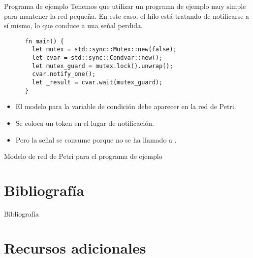 \documentclass{beamer}
\begin{document}
\begin{frame}[fragile]{Programa de ejemplo}
  Tenemos que utilizar un programa de ejemplo muy simple para mantener la red pequeña.
  En este caso, el hilo está tratando de notificarse a sí mismo, lo que conduce a una señal perdida.

  \begin{listing}
    \begin{verbatim}
      fn main() {
        let mutex = std::sync::Mutex::new(false);
        let cvar = std::sync::Condvar::new();
        let mutex_guard = mutex.lock().unwrap();
        cvar.notify_one();
        let _result = cvar.wait(mutex_guard);
      }     
    \end{verbatim}
  \end{listing}

  \begin{itemize}
    \item El modelo para la variable de condición debe aparecer en la red de Petri.
    \item Se coloca un token en el lugar de notificación.
    \item Pero la señal se consume porque no se ha llamado a .
  \end{itemize}
\end{frame}

\begin{frame}{Modelo de red de Petri para el programa de ejemplo}
  \begin{figure}
    \centering
    
  \end{figure}
\end{frame}

\section{Bibliografía}

\begin{frame}[allowframebreaks]{Bibliografía}
  \tiny
  
  
\end{frame}

\section{Recursos adicionales}
\end{document}
